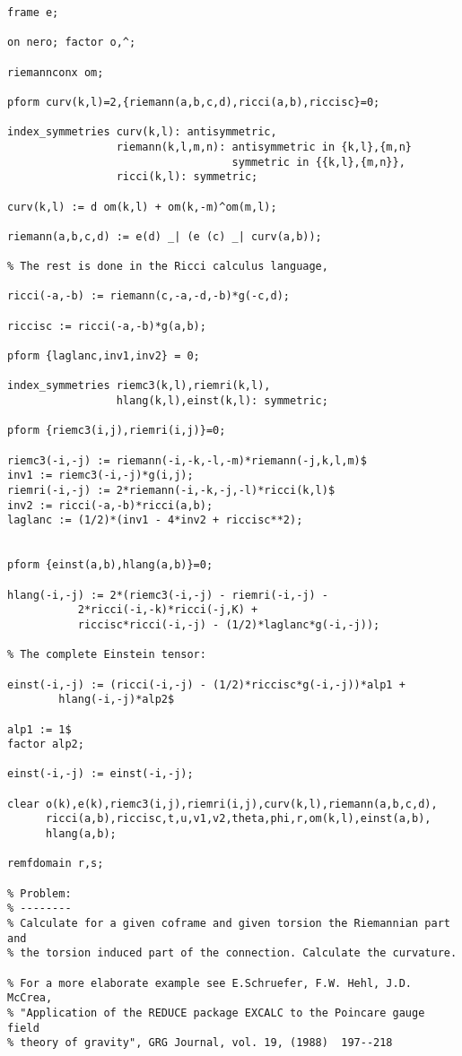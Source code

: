 {\begin{verbatim}
frame e;

on nero; factor o,^;

riemannconx om;

pform curv(k,l)=2,{riemann(a,b,c,d),ricci(a,b),riccisc}=0;

index_symmetries curv(k,l): antisymmetric,
                 riemann(k,l,m,n): antisymmetric in {k,l},{m,n}
                                   symmetric in {{k,l},{m,n}},
                 ricci(k,l): symmetric;

curv(k,l) := d om(k,l) + om(k,-m)^om(m,l);

riemann(a,b,c,d) := e(d) _| (e (c) _| curv(a,b));

% The rest is done in the Ricci calculus language,

ricci(-a,-b) := riemann(c,-a,-d,-b)*g(-c,d);

riccisc := ricci(-a,-b)*g(a,b);

pform {laglanc,inv1,inv2} = 0;

index_symmetries riemc3(k,l),riemri(k,l),
                 hlang(k,l),einst(k,l): symmetric;

pform {riemc3(i,j),riemri(i,j)}=0;

riemc3(-i,-j) := riemann(-i,-k,-l,-m)*riemann(-j,k,l,m)$
inv1 := riemc3(-i,-j)*g(i,j);
riemri(-i,-j) := 2*riemann(-i,-k,-j,-l)*ricci(k,l)$
inv2 := ricci(-a,-b)*ricci(a,b);
laglanc := (1/2)*(inv1 - 4*inv2 + riccisc**2);


pform {einst(a,b),hlang(a,b)}=0;

hlang(-i,-j) := 2*(riemc3(-i,-j) - riemri(-i,-j) -
		   2*ricci(-i,-k)*ricci(-j,K) +
		   riccisc*ricci(-i,-j) - (1/2)*laglanc*g(-i,-j));

% The complete Einstein tensor:

einst(-i,-j) := (ricci(-i,-j) - (1/2)*riccisc*g(-i,-j))*alp1 +
		hlang(-i,-j)*alp2$

alp1 := 1$
factor alp2;

einst(-i,-j) := einst(-i,-j);

clear o(k),e(k),riemc3(i,j),riemri(i,j),curv(k,l),riemann(a,b,c,d),
      ricci(a,b),riccisc,t,u,v1,v2,theta,phi,r,om(k,l),einst(a,b),
      hlang(a,b);

remfdomain r,s;

% Problem:
% --------
% Calculate for a given coframe and given torsion the Riemannian part and
% the torsion induced part of the connection. Calculate the curvature.

% For a more elaborate example see E.Schruefer, F.W. Hehl, J.D. McCrea,
% "Application of the REDUCE package EXCALC to the Poincare gauge field
% theory of gravity", GRG Journal, vol. 19, (1988)  197--218


\end{verbatim}}

